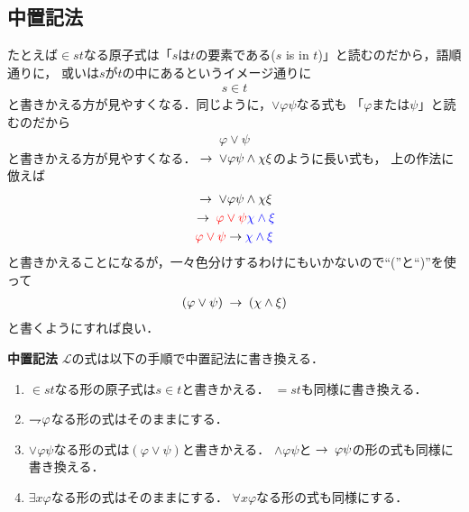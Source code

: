 \subsection{中置記法}
	たとえば$\in s t$なる原子式は「$s$は$t$の要素である($s$ is in $t$)」と読むのだから，語順通りに，
	或いは$s$が$t$の中にあるというイメージ通りに
	\begin{align}
		s \in t
	\end{align}
	と書きかえる方が見やすくなる．同じように，$\vee \varphi \psi$なる式も
	「$\varphi$または$\psi$」と読むのだから
	\begin{align}
		\varphi \vee \psi
	\end{align}
	と書きかえる方が見やすくなる．$\hspace{0.25em}\rightarrow\hspace{0.25em} \vee \varphi \psi \wedge \chi \xi$のように長い式も，
	上の作法に倣えば
	\begin{align}
		\begin{gathered}
			\hspace{0.25em}\rightarrow\hspace{0.25em} \vee \varphi \psi \wedge \chi \xi \\
			\hspace{0.25em}\rightarrow\hspace{0.25em} \color{red}{\varphi \vee \psi} \color{blue}{\chi \wedge \xi} \\
			\color{red}{\varphi \vee \psi} \color{black}{\hspace{0.25em}\rightarrow\hspace{0.25em}} \color{blue}{\chi \wedge \xi}
		\end{gathered}
	\end{align}
	と書きかえることになるが，一々色分けするわけにもいかないので``(''と``)''を使って
	\begin{align}
		(\varphi \vee \psi) \hspace{0.25em}\rightarrow\hspace{0.25em} (\chi \wedge \xi)
	\end{align}
	と書くようにすれば良い．
	
	\begin{itembox}[l]{{\bf 中置記法}}
			$\mathcal{L}$の式は以下の手順で中置記法に書き換える．
			\begin{enumerate}
				\item $\in s t$なる形の原子式は$s \in t$と書きかえる．
					$= s t$も同様に書き換える．
					
				\item $\rightharpoondown\hspace{-0.25em} \varphi$なる形の式はそのままにする．
				
				\item $\vee \varphi \psi$なる形の式は$(\varphi \vee \psi)$と書きかえる．
					$\wedge \varphi \psi$と$\hspace{0.25em}\rightarrow\hspace{0.25em} \varphi \psi$の形の式も同様に書き換える．
				
				\item $\exists x \varphi$なる形の式はそのままにする．
					$\forall x \varphi$なる形の式も同様にする．
			\end{enumerate}
	\end{itembox}
	
